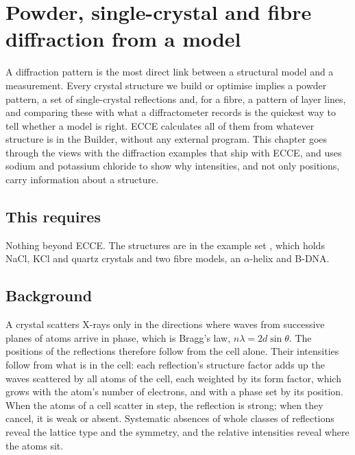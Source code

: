 \chapter{Powder, single-crystal and fibre diffraction from a model}
\label{ch:diffraction}

A diffraction pattern is the most direct link between a structural model and a measurement. Every crystal structure we build or optimise implies a powder pattern, a set of single-crystal reflections and, for a fibre, a pattern of layer lines, and comparing these with what a diffractometer records is the quickest way to tell whether a model is right. ECCE calculates all of them from whatever structure is in the Builder, without any external program. This chapter goes through the views with the diffraction examples that ship with ECCE, and uses sodium and potassium chloride to show why intensities, and not only positions, carry information about a structure.

\section*{This requires}
Nothing beyond ECCE. The structures are in the example set , which holds NaCl, KCl and quartz crystals and two fibre models, an $\alpha$-helix and B-DNA.

\section{Background}
A crystal scatters X-rays only in the directions where waves from successive planes of atoms arrive in phase, which is Bragg's law, $n\lambda = 2d\sin\theta$. The positions of the reflections therefore follow from the cell alone. Their intensities follow from what is in the cell: each reflection's structure factor adds up the waves scattered by all atoms of the cell, each weighted by its form factor, which grows with the atom's number of electrons, and with a phase set by its position. When the atoms of a cell scatter in step, the reflection is strong; when they cancel, it is weak or absent. Systematic absences of whole classes of reflections reveal the lattice type and the symmetry, and the relative intensities reveal where the atoms sit.

